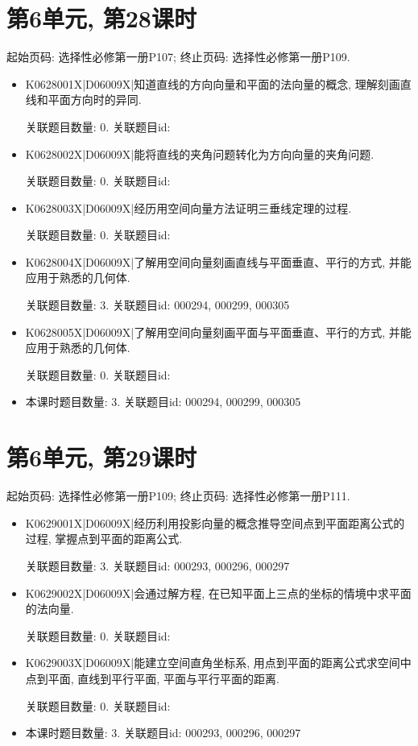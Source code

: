 \section*{第6单元, 第28课时}
起始页码: 选择性必修第一册P107; 终止页码: 选择性必修第一册P109.
\begin{itemize}
\item K0628001X|D06009X|知道直线的方向向量和平面的法向量的概念, 理解刻画直线和平面方向时的异同.

关联题目数量: 0. 关联题目id: 

\item K0628002X|D06009X|能将直线的夹角问题转化为方向向量的夹角问题.

关联题目数量: 0. 关联题目id: 

\item K0628003X|D06009X|经历用空间向量方法证明三垂线定理的过程.

关联题目数量: 0. 关联题目id: 

\item K0628004X|D06009X|了解用空间向量刻画直线与平面垂直、平行的方式, 并能应用于熟悉的几何体.

关联题目数量: 3. 关联题目id: 000294, 000299, 000305

\item K0628005X|D06009X|了解用空间向量刻画平面与平面垂直、平行的方式, 并能应用于熟悉的几何体.

关联题目数量: 0. 关联题目id: 

\item 本课时题目数量: 3. 关联题目id: 000294, 000299, 000305

\end{itemize}

\section*{第6单元, 第29课时}
起始页码: 选择性必修第一册P109; 终止页码: 选择性必修第一册P111.
\begin{itemize}
\item K0629001X|D06009X|经历利用投影向量的概念推导空间点到平面距离公式的过程, 掌握点到平面的距离公式.

关联题目数量: 3. 关联题目id: 000293, 000296, 000297

\item K0629002X|D06009X|会通过解方程, 在已知平面上三点的坐标的情境中求平面的法向量.

关联题目数量: 0. 关联题目id: 

\item K0629003X|D06009X|能建立空间直角坐标系, 用点到平面的距离公式求空间中点到平面, 直线到平行平面, 平面与平行平面的距离.

关联题目数量: 0. 关联题目id: 

\item 本课时题目数量: 3. 关联题目id: 000293, 000296, 000297

\end{itemize}

